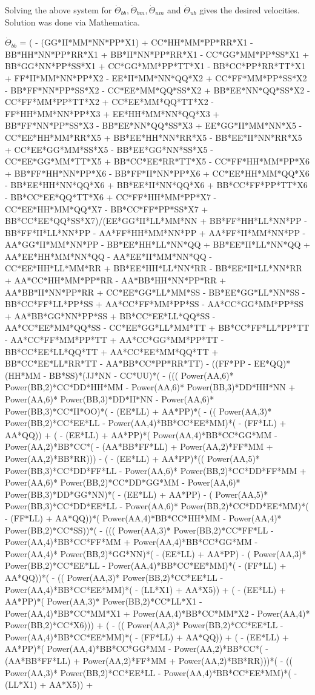 \documentclass[10pt]{article} %
\begin{document}
Solving the above system for $\dot{\Theta}_{bb}, \dot{\Theta}_{bm}, \dot{\Theta}_{um}$ and $\dot{\Theta}_{ub}$ gives the desired velocities. Solution was done via Mathematica.

$\dot{\Theta}_{bb}$ =
{\tiny
( - (GG*II*MM*NN*PP*X1) + CC*HH*MM*PP*RR*X1 - BB*HH*NN*PP*RR*X1 + BB*II*NN*PP*RR*X1 - CC*GG*MM*PP*SS*X1 + BB*GG*NN*PP*SS*X1 + CC*GG*MM*PP*TT*X1 - BB*CC*PP*RR*TT*X1 + FF*II*MM*NN*PP*X2 - EE*II*MM*NN*QQ*X2 + CC*FF*MM*PP*SS*X2 - BB*FF*NN*PP*SS*X2 - CC*EE*MM*QQ*SS*X2 + BB*EE*NN*QQ*SS*X2 - CC*FF*MM*PP*TT*X2 + CC*EE*MM*QQ*TT*X2 - FF*HH*MM*NN*PP*X3 + EE*HH*MM*NN*QQ*X3 + BB*FF*NN*PP*SS*X3 - BB*EE*NN*QQ*SS*X3 + EE*GG*II*MM*NN*X5 - CC*EE*HH*MM*RR*X5 + BB*EE*HH*NN*RR*X5 - BB*EE*II*NN*RR*X5 + CC*EE*GG*MM*SS*X5 - BB*EE*GG*NN*SS*X5 - CC*EE*GG*MM*TT*X5 + BB*CC*EE*RR*TT*X5 - CC*FF*HH*MM*PP*X6 + BB*FF*HH*NN*PP*X6 - BB*FF*II*NN*PP*X6 + CC*EE*HH*MM*QQ*X6 - BB*EE*HH*NN*QQ*X6 + BB*EE*II*NN*QQ*X6 + BB*CC*FF*PP*TT*X6 - BB*CC*EE*QQ*TT*X6 + CC*FF*HH*MM*PP*X7 - CC*EE*HH*MM*QQ*X7 - BB*CC*FF*PP*SS*X7 + BB*CC*EE*QQ*SS*X7)/(EE*GG*II*LL*MM*NN + BB*FF*HH*LL*NN*PP - BB*FF*II*LL*NN*PP - AA*FF*HH*MM*NN*PP + AA*FF*II*MM*NN*PP - AA*GG*II*MM*NN*PP - BB*EE*HH*LL*NN*QQ + BB*EE*II*LL*NN*QQ + AA*EE*HH*MM*NN*QQ - AA*EE*II*MM*NN*QQ - CC*EE*HH*LL*MM*RR + BB*EE*HH*LL*NN*RR - BB*EE*II*LL*NN*RR + AA*CC*HH*MM*PP*RR - AA*BB*HH*NN*PP*RR + AA*BB*II*NN*PP*RR + CC*EE*GG*LL*MM*SS - BB*EE*GG*LL*NN*SS - BB*CC*FF*LL*PP*SS + AA*CC*FF*MM*PP*SS - AA*CC*GG*MM*PP*SS + AA*BB*GG*NN*PP*SS + BB*CC*EE*LL*QQ*SS - AA*CC*EE*MM*QQ*SS - CC*EE*GG*LL*MM*TT + BB*CC*FF*LL*PP*TT - AA*CC*FF*MM*PP*TT + AA*CC*GG*MM*PP*TT - BB*CC*EE*LL*QQ*TT + AA*CC*EE*MM*QQ*TT + BB*CC*EE*LL*RR*TT - AA*BB*CC*PP*RR*TT) - ((FF*PP - EE*QQ)*(HH*MM - BB*SS)*(JJ*NN - CC*UU)*( - ((( Power(AA,6)* Power(BB,2)*CC*DD*HH*MM -  Power(AA,6)* Power(BB,3)*DD*HH*NN +  Power(AA,6)* Power(BB,3)*DD*II*NN -  Power(AA,6)* Power(BB,3)*CC*II*OO)*( - (EE*LL) + AA*PP)*( - (( Power(AA,3)* Power(BB,2)*CC*EE*LL -  Power(AA,4)*BB*CC*EE*MM)*( - (FF*LL) + AA*QQ)) + ( - (EE*LL) + AA*PP)*( Power(AA,4)*BB*CC*GG*MM -  Power(AA,2)*BB*CC*( - (AA*BB*FF*LL) +  Power(AA,2)*FF*MM +  Power(AA,2)*BB*RR))) - ( - (EE*LL) + AA*PP)*(( Power(AA,5)* Power(BB,3)*CC*DD*FF*LL -  Power(AA,6)* Power(BB,2)*CC*DD*FF*MM +  Power(AA,6)* Power(BB,2)*CC*DD*GG*MM -  Power(AA,6)* Power(BB,3)*DD*GG*NN)*( - (EE*LL) + AA*PP) - ( Power(AA,5)* Power(BB,3)*CC*DD*EE*LL -  Power(AA,6)* Power(BB,2)*CC*DD*EE*MM)*( - (FF*LL) + AA*QQ))*( Power(AA,4)*BB*CC*HH*MM -  Power(AA,4)* Power(BB,2)*CC*SS))*( - ((( Power(AA,3)* Power(BB,2)*CC*FF*LL -  Power(AA,4)*BB*CC*FF*MM +  Power(AA,4)*BB*CC*GG*MM -  Power(AA,4)* Power(BB,2)*GG*NN)*( - (EE*LL) + AA*PP) - ( Power(AA,3)* Power(BB,2)*CC*EE*LL -  Power(AA,4)*BB*CC*EE*MM)*( - (FF*LL) + AA*QQ))*( - (( Power(AA,3)* Power(BB,2)*CC*EE*LL -  Power(AA,4)*BB*CC*EE*MM)*( - (LL*X1) + AA*X5)) + ( - (EE*LL) + AA*PP)*( Power(AA,3)* Power(BB,2)*CC*LL*X1 -  Power(AA,4)*BB*CC*MM*X1 +  Power(AA,4)*BB*CC*MM*X2 -  Power(AA,4)* Power(BB,2)*CC*X6))) + ( - (( Power(AA,3)* Power(BB,2)*CC*EE*LL -  Power(AA,4)*BB*CC*EE*MM)*( - (FF*LL) + AA*QQ)) + ( - (EE*LL) + AA*PP)*( Power(AA,4)*BB*CC*GG*MM -  Power(AA,2)*BB*CC*( - (AA*BB*FF*LL) +  Power(AA,2)*FF*MM +  Power(AA,2)*BB*RR)))*( - (( Power(AA,3)* Power(BB,2)*CC*EE*LL -  Power(AA,4)*BB*CC*EE*MM)*( - (LL*X1) + AA*X5)) + }
\end{document}
